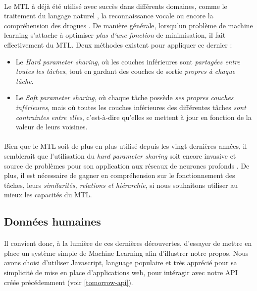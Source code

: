 \paragraph{} Le MTL à déjà été utilisé avec succès dans différents domaines, comme le traitement du langage naturel \cite{MultiLearning0},
la reconnaissance vocale \cite{MultiLearning1} ou encore la compréhension des drogues \cite{MultiLearning2}. De manière générale, lorsqu'un
problème de machine learning s'attache à optimiser \emph{plus d'une fonction} de minimisation, il fait effectivement du MTL. Deux méthodes 
existent pour appliquer ce dernier :

\begin{itemize}
    \item Le \emph{Hard parameter sharing}, où les couches inférieures sont \emph{partagées entre toutes les tâches}, tout en gardant
    des couches de sortie \emph{propres à chaque tâche}.

    \item Le \emph{Soft parameter sharing}, où chaque tâche possède \emph{ses propres couches inférieures}, mais où toutes les couches
    inférieures des différentes tâches \emph{sont contraintes entre elles}, c'est-à-dire qu'elles se mettent à jour en fonction de la valeur
    de leurs voisines.
\end{itemize}

\paragraph{} Bien que le MTL soit de plus en plus utilisé depuis les vingt dernières années, il semblerait que l'utilisation 
du \emph{hard parameter sharing} soit encore invasive et source de problèmes pour son application aux réseaux de neurones profonds
\cite{NeuralNets0}. De plus, il est nécessaire de gagner en compréhension sur le fonctionnement des tâches, leurs \emph{similarités,
relations et hiérarchie}, si nous souhaitons utiliser au mieux les capacités du MTL.


\subsection*{Données humaines}

\paragraph{} Il convient donc, à la lumière de ces dernières découvertes, d'essayer de mettre
en place un système simple de Machine Learning afin d'illustrer notre propos. Nous avons choisi
d'utiliser Javascript, language populaire et très apprécié pour sa simplicité de mise en place
d'applications web, pour intéragir avec notre API créée précédemment (voir \ref{tomorrow-api}).

